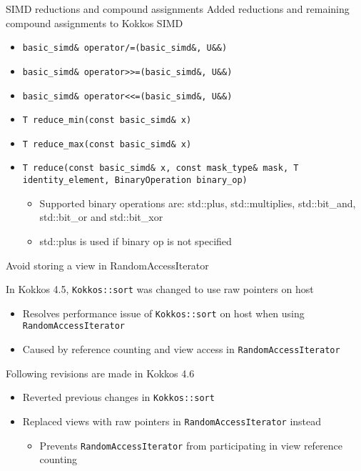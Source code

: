 \begin{frame}[fragile]{SIMD reductions and compound assignments}
  Added reductions and remaining compound assignments to Kokkos SIMD

  \begin{itemize}
    \item \texttt{basic\_simd\& operator/=(basic\_simd\&, U\&\&)}
    \item \texttt{basic\_simd\& operator>>=(basic\_simd\&, U\&\&)}
    \item \texttt{basic\_simd\& operator<<=(basic\_simd\&, U\&\&)}
  \end{itemize}

  \vspace{5pt}
  
  \begin{itemize}
    \item \texttt{T reduce\_min(const basic\_simd\& x)}
    \item \texttt{T reduce\_max(const basic\_simd\& x)}
    \item \texttt{T reduce(const basic\_simd\& x, const mask\_type\& mask, T identity\_element, BinaryOperation binary\_op)}
      \begin{itemize}
        \item Supported binary operations are: std::plus, std::multiplies, std::bit\_and, std::bit\_or and std::bit\_xor
        \item std::plus is used if binary op is not specified
      \end{itemize}
  \end{itemize}

\end{frame}
\begin{frame}[fragile]{Avoid storing a view in RandomAccessIterator}

  In Kokkos 4.5, \texttt{Kokkos::sort} was changed to use raw pointers on host
  \begin{itemize}
    \item Resolves performance issue of \texttt{Kokkos::sort} on host when using \texttt{RandomAccessIterator}
    \item Caused by reference counting and view access in \texttt{RandomAccessIterator}
  \end{itemize}

  \vspace{10pt}
  
  Following revisions are made in Kokkos 4.6
  \begin{itemize} 
    \item Reverted previous changes in \texttt{Kokkos::sort}
    \item Replaced views with raw pointers in \texttt{RandomAccessIterator} instead
    \begin{itemize}
      \item Prevents \texttt{RandomAccessIterator} from participating in view reference counting
    \end{itemize}
  \end{itemize}

\end{frame}
